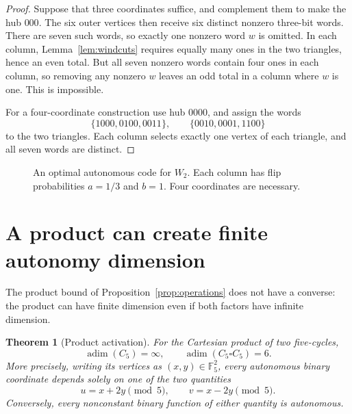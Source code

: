 \documentclass[11pt]{article}
\newtheorem{theorem}{Theorem}[section]
\theoremstyle{definition}
\newcommand{\adim}{\operatorname{adim}}
\newcommand{\F}{\mathbb F}
\numberwithin{equation}{section}
\begin{document}
\begin{proof}
Suppose that three coordinates suffice, and complement them to make the
hub $000$. The six outer vertices then receive six distinct nonzero
three-bit words. There are seven such words, so exactly one nonzero word
$w$ is omitted. In each column, Lemma~\ref{lem:windcuts} requires equally
many ones in the two triangles, hence an even total. But all seven
nonzero words contain four ones in each column, so removing any nonzero
$w$ leaves an odd total in a column where $w$ is one. This is impossible.

For a four-coordinate construction use hub $0000$, and assign the words
\[
 \{1000,0100,0011\},\qquad \{0010,0001,1100\}
\]
to the two triangles. Each column selects exactly one vertex of each
triangle, and all seven words are distinct.
\end{proof}

\begin{figure}[ht]
\centering
{}
\caption{An optimal autonomous code for $W_2$. Each column has flip
probabilities $a=1/3$ and $b=1$. Four coordinates are necessary.}
\end{figure}

\section{A product can create finite autonomy dimension}

The product bound of Proposition~\ref{prop:operations} does not have a
converse: the product can have finite dimension even if both factors have
infinite dimension.

\begin{theorem}[Product activation]\label{thm:product}
For the Cartesian product of two five-cycles,
\[
 \adim(C_5)=\infty,\qquad \adim(C_5\square C_5)=6.
\]
More precisely, writing its vertices as $(x,y)\in\F_5^2$, every autonomous
binary coordinate depends solely on one of the two quantities
\begin{equation}\label{eq:uv}
 u=x+2y\pmod5,\qquad v=x-2y\pmod5.
\end{equation}
Conversely, every nonconstant binary function of either quantity is
autonomous.
\end{theorem}
\end{document}
